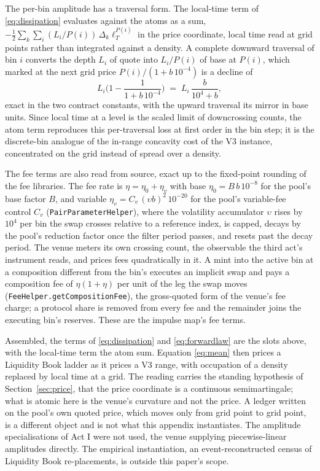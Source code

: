 \documentclass[11pt,a4paper]{article}
\theoremstyle{definition}
\theoremstyle{plain}
\theoremstyle{remark}
\begin{document}
The per-bin amplitude has a traversal form. The local-time term of \eqref{eq:dissipation} evaluates against the atoms as a sum, $-\tfrac12 \sum_k \sum_i (L_i/P(i))\, \Delta_k \ell^{P(i)}_T$ in the 
price coordinate, local time read at grid points rather than integrated against a density. A complete downward traversal of bin $i$ converts the depth $L_i$ of quote into $L_i/P(i)$ of base at $P(i)$, 
which marked at the next grid price $P(i)/(1+b\,10^{-4})$ is a decline of
\[
L_i \Big( 1 - \frac{1}{1+b\,10^{-4}} \Big)
\;=\; L_i\, \frac{b}{10^4 + b},
\]
exact in the two contract constants, with the upward traversal its mirror in base units. Since local time at a level is the scaled limit of downcrossing counts,\cite{revuzyor} the atom term reproduces 
this per-traversal loss at first order in the bin step; it is the discrete-bin analogue of the in-range concavity cost of the V3 instance, concentrated on the grid instead of spread over a density.

The fee terms are also read from source, exact up to the fixed-point rounding of the fee libraries. The fee rate is $\eta = \eta_0 + \eta_v$ with base $\eta_0 = B\, b\, 10^{-8}$ for the pool's base 
factor $B$, and variable $\eta_v = C_v\, (\upsilon
b)^2\, 10^{-20}$ for the pool's variable-fee control $C_v$ (\texttt{PairParameterHelper}), where the volatility accumulator $\upsilon$ rises by $10^4$ per 
bin the swap crosses relative to a reference index, is capped, decays by the pool's reduction factor once the filter period passes, and resets past the decay period. The venue meters its own crossing count, 
the observable the third act's instrument reads, and prices fees quadratically in it. A mint into the active bin at a composition different from the bin's executes an implicit swap and pays a 
composition fee of $\eta(1+\eta)$ per unit of the leg the swap moves (\texttt{FeeHelper.getCompositionFee}), the gross-quoted form of the venue's fee charge; a protocol share is removed from every 
fee and the remainder joins the executing bin's reserves. These are the impulse map's fee terms.

Assembled, the terms of \eqref{eq:dissipation} and \eqref{eq:forwardlaw} are the slots above, with the local-time term the atom sum. Equation \eqref{eq:mean} then prices a Liquidity Book ladder 
as it prices a V3 range, with occupation of a density replaced by local time at a grid. The reading carries the standing hypothesis of Section~\ref{sec:price}, that the price coordinate is a continuous 
semimartingale; what is atomic here is the venue's curvature and not the price. A ledger written on the pool's own quoted price, which moves only from grid point to grid point, is a different object 
and is not what this appendix instantiates. The amplitude specialisations of Act I were not used, the venue supplying piecewise-linear amplitudes directly. The empirical instantiation, an 
event-reconstructed census of Liquidity Book re-placements, is outside this paper's scope.
\end{document}
